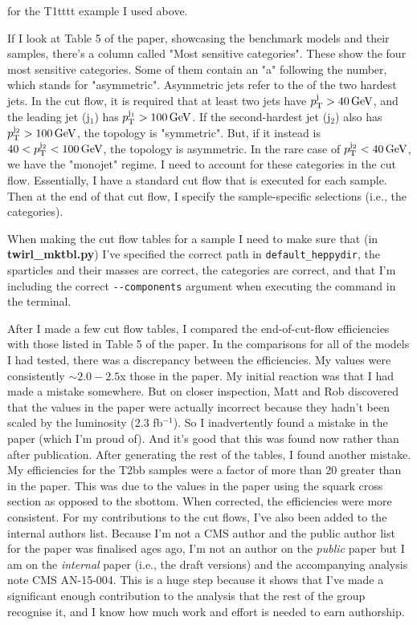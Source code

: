 for the T1tttt example I used above.

If I look at Table 5 of the paper, showcasing the benchmark models and their samples, there's a column called "Most sensitive \njet categories". These show the four most sensitive categories. Some of them contain an "a" following the number, which stands for "asymmetric". Asymmetric jets refer to the \pt of the two hardest jets. In the cut flow, it is required that at least two jets have $p_{\mathrm{T}}^{\mathrm{j}} > 40\,\text{G\text{e\kern-0.15ex V}}$, and the leading jet (j$_1$) has $p_{\mathrm{T}}^{\mathrm{j}_1} > 100\,\text{G\text{e\kern-0.15ex V}}$. If the second-hardest jet (j$_2$) also has $p_{\mathrm{T}}^{\mathrm{j_2}} > 100\,\text{G\text{e\kern-0.15ex V}}$, the topology is "symmetric". But, if it instead is $40 < p_{\mathrm{T}}^{\mathrm{j_2}} < 100\,\text{G\text{e\kern-0.15ex V}}$, the topology is asymmetric. In the rare case of $p_{\mathrm{T}}^{\mathrm{j_2}} < 40\,\text{G\text{e\kern-0.15ex V}}$, we have the "monojet" regime. I need to account for these \njet categories in the cut flow. Essentially, I have a standard cut flow that is executed for each sample. Then at the end of that cut flow, I specify the sample-specific selections (i.e., the \njet categories).

When making the cut flow tables for a sample I need to make sure that (in \textbf{twirl\_mktbl.py}) I've specified the correct path in \verb!default_heppydir!, the sparticles and their masses are correct, the \njet categories are correct, and that I'm including the correct \verb!--components! argument when executing the command in the terminal.

After I made a few cut flow tables, I compared the end-of-cut-flow efficiencies with those listed in Table 5 of the paper. In the comparisons for all of the models I had tested, there was a discrepancy between the efficiencies. My values were consistently $\sim 2.0-2.5$x those in the paper. My initial reaction was that I had made a mistake somewhere. But on closer inspection, Matt and Rob discovered that the values in the paper were actually incorrect because they hadn't been scaled by the luminosity (2.3 fb$^{-1}$). So I inadvertently found a mistake in the paper (which I'm proud of). And it's good that this was found now rather than after publication. After generating the rest of the tables, I found another mistake. My efficiencies for the T2bb samples were a factor of more than 20 greater than in the paper. This was due to the values in the paper using the squark cross section as opposed to the sbottom. When corrected, the efficiencies were more consistent. For my contributions to the cut flows, I've also been added to the internal authors list. Because I'm not a CMS author and the public author list for the paper was finalised ages ago, I'm not an author on the \emph{public} paper but I am on the \emph{internal} paper (i.e., the draft versions) and the accompanying analysis note CMS AN-15-004. This is a huge step because it shows that I've made a significant enough contribution to the analysis that the rest of the group recognise it, and I know how much work and effort is needed to earn authorship.

